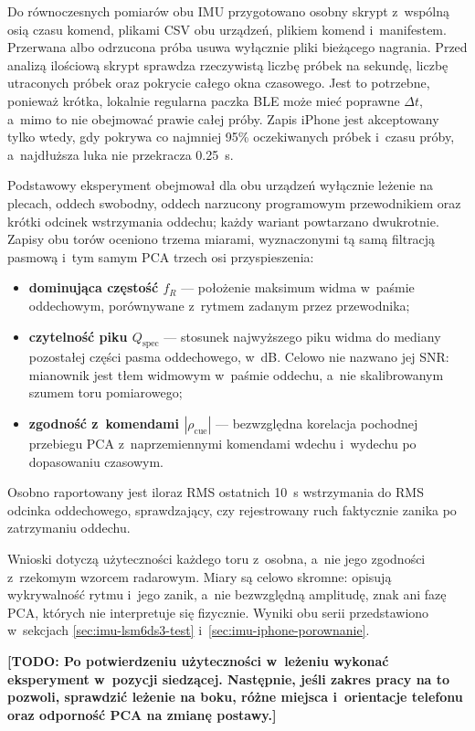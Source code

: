 \documentclass[12pt,a4paper,oneside]{report}
\newcommand{\todo}[1]{\textcolor{red!75!black}{\textbf{[TODO: #1]}}}
\begin{document}
Do równoczesnych pomiarów obu IMU przygotowano osobny skrypt z~wspólną osią
czasu komend, plikami CSV obu urządzeń, plikiem komend i~manifestem. Przerwana
albo odrzucona próba usuwa wyłącznie pliki bieżącego nagrania. Przed analizą
ilościową skrypt sprawdza rzeczywistą liczbę próbek na sekundę, liczbę
utraconych próbek oraz pokrycie całego okna czasowego. Jest to potrzebne,
ponieważ krótka, lokalnie regularna paczka BLE może mieć poprawne $\Delta t$,
a~mimo to nie obejmować prawie całej próby. Zapis iPhone jest akceptowany
tylko wtedy, gdy pokrywa co najmniej 95\% oczekiwanych próbek i~czasu próby,
a~najdłuższa luka nie przekracza \SI{0.25}{s}.

Podstawowy eksperyment obejmował dla obu urządzeń wyłącznie leżenie na plecach,
oddech swobodny, oddech narzucony programowym przewodnikiem oraz krótki odcinek
wstrzymania oddechu; każdy wariant powtarzano dwukrotnie. Zapisy obu torów
oceniono trzema miarami, wyznaczonymi tą samą filtracją pasmową i~tym samym
PCA trzech osi przyspieszenia:
\begin{itemize}
  \item \textbf{dominująca częstość $f_R$} --- położenie maksimum widma
  w~paśmie oddechowym, porównywane z~rytmem zadanym przez przewodnika;
  \item \textbf{czytelność piku $Q_{\mathrm{spec}}$} --- stosunek najwyższego
  piku widma do mediany pozostałej części pasma oddechowego, w~dB. Celowo nie
  nazwano jej SNR: mianownik jest tłem widmowym w~paśmie oddechu, a~nie
  skalibrowanym szumem toru pomiarowego;
  \item \textbf{zgodność z~komendami $|\rho_{\mathrm{cue}}|$} --- bezwzględna
  korelacja pochodnej przebiegu PCA z~naprzemiennymi komendami wdechu
  i~wydechu po dopasowaniu czasowym.
\end{itemize}
Osobno raportowany jest iloraz RMS ostatnich \SI{10}{s} wstrzymania do RMS
odcinka oddechowego, sprawdzający, czy rejestrowany ruch faktycznie zanika po
zatrzymaniu oddechu.

Wnioski dotyczą użyteczności każdego toru z~osobna, a~nie jego zgodności
z~rzekomym wzorcem radarowym. Miary są celowo skromne: opisują wykrywalność
rytmu i~jego zanik, a~nie bezwzględną amplitudę, znak ani fazę PCA, których nie
interpretuje się fizycznie. Wyniki obu serii przedstawiono w~sekcjach
\ref{sec:imu-lsm6ds3-test} i~\ref{sec:imu-iphone-porownanie}.

\todo{Po potwierdzeniu użyteczności w~leżeniu wykonać eksperyment
w~pozycji siedzącej. Następnie, jeśli zakres pracy na to pozwoli, sprawdzić
leżenie na boku, różne miejsca i~orientacje telefonu oraz odporność PCA na
zmianę postawy.}
\end{document}
